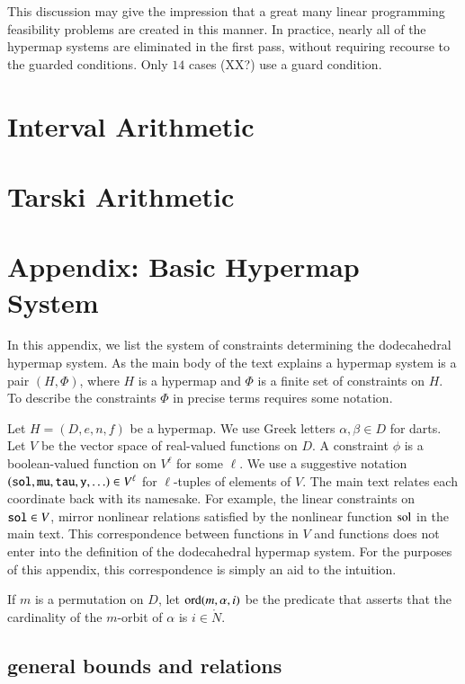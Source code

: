 This discussion may give the impression 
that a great many linear programming feasibility
problems are created in this manner.  In practice, nearly all
of the hypermap systems are eliminated in the first pass, without
requiring recourse to the guarded conditions.  Only
$14$ cases (XX?) use a guard condition.




\section{Interval Arithmetic}

\section{Tarski Arithmetic}


\section{Appendix: Basic Hypermap System}

In this appendix, we list the system of constraints determining
the dodecahedral hypermap system.  As the main body of the text explains
a hypermap system is a pair $(H,\Phi)$, where $H$ is a hypermap
and $\Phi$ is a finite set of constraints on $H$.  To describe
the constraints $\Phi$ in precise terms requires some notation.

Let $H=(D,e,n,f)$ be a hypermap.  We use Greek letters
$\alpha,\beta \in D$ for darts.  Let $V$ be the vector space 
of real-valued  functions on $D$.  A constraint $\phi$ is a boolean-valued function on $V^\ell$ for some $\ell$.  We use a suggestive
notation $({\operatorname{{\texttt{sol}}}},{\operatorname{{\texttt{mu}}}},{\operatorname{{\texttt{tau}}}},{\operatorname{{\texttt{y}}}},\ldots)\in V^\ell$ for $\ell$-tuples
of elements of $V$.  The main text relates each coordinate back
with its namesake.  For example, the linear constraints on
${\operatorname{{\texttt{sol}}}}\in V$, mirror  nonlinear relations satisfied by the
nonlinear function $\operatorname{sol}$ in the main text.  This correspondence
between functions in $V$ and functions does not enter into the
definition of the dodecahedral hypermap system.  For the purposes of this
appendix, this correspondence is simply an aid to the
intuition.

If $m$ is  a permutation on $D$, let ${\operatorname{ord}}(m,\alpha,i)$
be the predicate that asserts that the cardinality of the $m$-orbit
of $\alpha$ is $i\in\ring{N}$.
\bigskip

\def\sland{\ \land\ }

\subsection{general bounds and relations}

